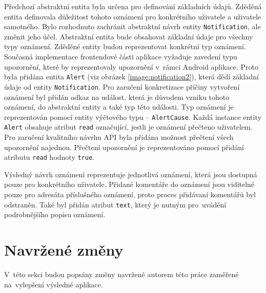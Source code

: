         Předchozí abstraktní entita byla určena pro definování základních údajů. Zděděná entita definovala důležitost tohoto oznámení pro konkrétního uživatele a uživatele samotného. Bylo rozhodnuto zachránit abstraktní návrh entity \verb|Notification|, ale změnit jeho účel. Abstraktní entita bude obsahovat základní údaje pro všechny typy oznámení. Zděděné entity budou reprezentovat konkrétní typ oznámení.
        Současná implementace frontendové části aplikace vyžaduje zavedení typu upozornění, které by reprezentovaly upozornění v~rámci Android aplikace. Proto byla přidána entita \verb|Alert| (viz obrázek \ref{image:notification2}), která dědí základní údaje od entity \verb|Notification|. Pro zaručení konkretizace příčiny vytvoření oznámení byl přidán odkaz na událost, která je důvodem vzniku tohoto oznámení, do abstraktní entity a také typ této události. Typ oznámení je reprezentován pomocí entity výčtového typu -- \verb|AlertCause|. 
        Každá instance entity \verb|Alert| obsahuje atribut \verb|read| označující, jestli je oznámení přečteno uživatelem. Pro zaručení kvalitního návrhu API byla přidána možnost přečtení všech upozornění najednou. Přečtení upozornění je reprezentováno pomocí přidání atributu \verb|read| hodnoty \verb|true|.
        
        Výsledný návrh oznámení reprezentuje jednotlivá oznámení, která jsou dostupná pouze pro konkrétního uživatele. Přidané komentáře do oznámení jsou viditelné pouze pro adresáta příslušného oznámení, proto proces přidávaní komentářů byl odstraněn. Také byl přidán atribut \verb|text|, který je nutným pro~uvádění podrobnějšího popisu oznámení.
            
\section{Navržené změny}
    V~této sekci budou popsány změny navržené autorem této práce zaměřené na~vylepšení výsledné aplikace.
    
